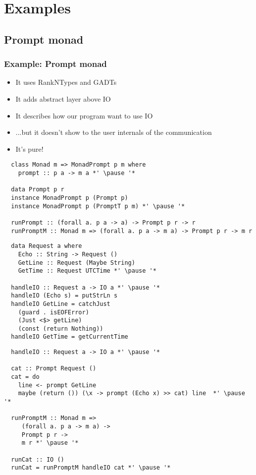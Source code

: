 \documentclass[aspectratio=43]{beamer}
\begin{document}
\section{Examples}

\subsection{Prompt monad}

\begin{frame}[fragile]
 \frametitle{Example: Prompt monad}
 \begin{itemize}
  \item It uses RankNTypes and GADTs
  \pause
  \item It adds abstract layer above IO
  \pause
  \item It describes how our program want to use IO
  \item ...but it doesn't show to the user internals of the communication
  \pause
  \item It's pure!
 \end{itemize}
\end{frame}


\begin{frame}[fragile]
 \begin{lstlisting}
  class Monad m => MonadPrompt p m where
    prompt :: p a -> m a *' \pause '*
    
  data Prompt p r
  instance MonadPrompt p (Prompt p)
  instance MonadPrompt p (PromptT p m) *' \pause '*
  
  runPrompt :: (forall a. p a -> a) -> Prompt p r -> r
  runPromptM :: Monad m => (forall a. p a -> m a) -> Prompt p r -> m r
 \end{lstlisting}
\end{frame}
  
\begin{frame}[fragile]
 \begin{lstlisting}  
  data Request a where
    Echo :: String -> Request ()
    GetLine :: Request (Maybe String)
    GetTime :: Request UTCTime *' \pause '*

  handleIO :: Request a -> IO a *' \pause '*
  handleIO (Echo s) = putStrLn s
  handleIO GetLine = catchJust
    (guard . isEOFError)
    (Just <$> getLine)
    (const (return Nothing))
  handleIO GetTime = getCurrentTime
 \end{lstlisting}
\end{frame}

\begin{frame}[fragile]
 \begin{lstlisting}
  handleIO :: Request a -> IO a *' \pause '*
  
  cat :: Prompt Request ()
  cat = do
    line <- prompt GetLine
    maybe (return ()) (\x -> prompt (Echo x) >> cat) line  *' \pause '*
  
  runPromptM :: Monad m =>
     (forall a. p a -> m a) ->
     Prompt p r ->
     m r *' \pause '*
  
  runCat :: IO ()
  runCat = runPromptM handleIO cat *' \pause '*
 \end{lstlisting}
\end{frame}
\end{document}
